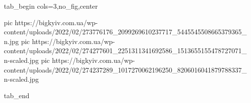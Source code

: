  
 
 
 
 


\ifcmt
  tab_begin cols=3,no_fig,center

     pic https://bigkyiv.com.ua/wp-content/uploads/2022/02/273776176_2099269610237717_5445545508665379365_n.jpg
		 pic https://bigkyiv.com.ua/wp-content/uploads/2022/02/274277601_2251311341692586_1513655155478727071_n-scaled.jpg
		 pic https://bigkyiv.com.ua/wp-content/uploads/2022/02/274237289_1017270062196250_8206016041879788337_n-scaled.jpg

  tab_end
\fi
